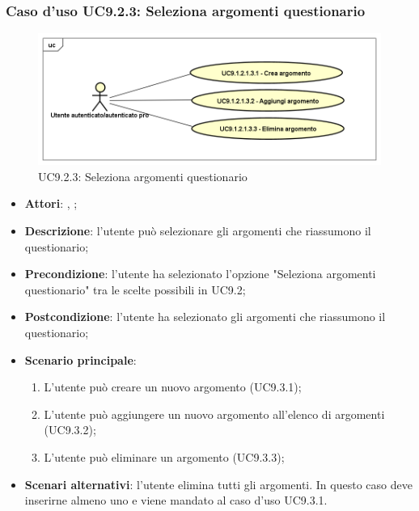 		\subsubsection{Caso d'uso UC9.2.3: Seleziona argomenti questionario}
		\label{UC9.2.3}
		\begin{figure}[h]
			\centering
		\includegraphics[scale=0.5,keepaspectratio]{UML/UC9_2_3.png}
			\caption{UC9.2.3: Seleziona argomenti questionario}
		\end{figure}
		\FloatBarrier
		\begin{itemize}
			\item \textbf{Attori}: \uau, \uaupro;
			\item \textbf{Descrizione}: l'utente può selezionare gli argomenti che riassumono il questionario;
			\item \textbf{Precondizione}: l'utente ha selezionato l'opzione "Seleziona argomenti questionario" tra le scelte possibili in UC9.2; 
			\item \textbf{Postcondizione}: l'utente ha selezionato gli argomenti che riassumono il questionario; 
			\item \textbf{Scenario principale}:
			\begin{enumerate}
				\item L'utente può creare un nuovo argomento (UC9.3.1);
				\item L'utente può aggiungere un nuovo argomento all'elenco di argomenti (UC9.3.2);
				\item L'utente può eliminare un argomento (UC9.3.3);
			\end{enumerate}
			\item \textbf{Scenari alternativi}: l'utente elimina tutti gli argomenti. In questo caso deve inserirne almeno uno e viene mandato al caso d'uso UC9.3.1.
		\end{itemize}
							
